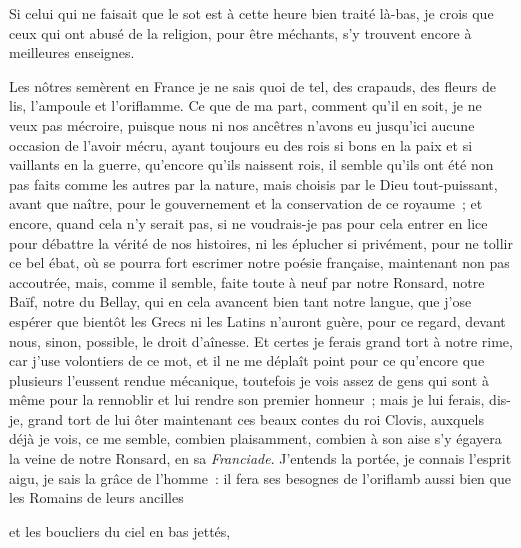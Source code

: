 \documentclass[french,twoside]{book} %
\begin{document}
\noindent Si celui qui ne faisait que le sot est à cette heure bien traité là-bas, je crois que ceux qui ont abusé de la religion, pour être méchants, s’y trouvent encore à meilleures enseignes.\par
Les nôtres semèrent en France je ne sais quoi de tel, des crapauds, des fleurs de lis, l’ampoule et l’oriflamme. Ce que de ma part, comment qu’il en soit, je ne veux pas mécroire, puisque nous ni nos ancêtres n’avons eu jusqu’ici aucune occasion de l’avoir mécru, ayant toujours eu des rois si bons en la paix et si vaillants en la guerre, qu’encore qu’ils naissent rois, il semble qu’ils ont été non pas faits comme les autres par la nature, mais choisis par le Dieu tout-puissant, avant que naître, pour le gouvernement et la conservation de ce royaume ; et encore, quand cela n’y serait pas, si ne voudrais-je pas pour cela entrer en lice pour débattre la vérité de nos histoires, ni les éplucher si privément, pour ne tollir ce bel ébat, où se pourra fort escrimer notre poésie française, maintenant non pas accoutrée, mais, comme il semble, faite toute à neuf par notre Ronsard, notre Baïf, notre du Bellay, qui en cela avancent bien tant notre langue, que j’ose espérer que bientôt les Grecs ni les Latins n’auront guère, pour ce regard, devant nous, sinon, possible, le droit d’aînesse. Et certes je ferais grand tort à notre rime, car j’use volontiers de ce mot, et il ne me déplaît point pour ce qu’encore que plusieurs l’eussent rendue mécanique, toutefois je vois assez de gens qui sont à même pour la rennoblir et lui rendre son premier honneur ; mais je lui ferais, dis-je, grand tort de lui ôter maintenant ces beaux contes du roi Clovis, auxquels déjà je vois, ce me semble, combien plaisamment, combien à son aise s’y égayera la veine de notre Ronsard, en sa \emph{Franciade}. J’entends la portée, je connais l’esprit aigu, je sais la grâce de l’homme : il fera ses besognes de l’oriflamb aussi bien que les Romains de leurs ancilles\par

et les boucliers du ciel en bas jettés,\\
\end{document}
